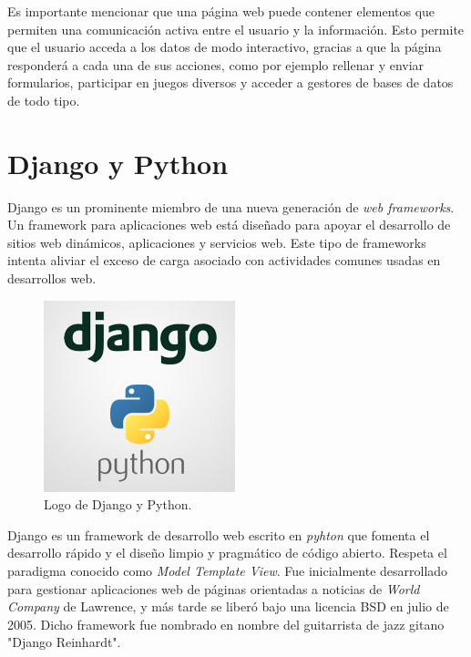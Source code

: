 Es importante mencionar que una p\'agina web puede contener elementos que permiten una comunicaci\'on activa entre el usuario y la informaci\'on. Esto permite que el usuario acceda a los datos de modo interactivo, gracias a que la p\'agina responder\'a a cada una de sus acciones, como por ejemplo rellenar y enviar formularios, participar en juegos diversos y acceder a gestores de bases de datos de todo tipo.\\

\section{Django y Python}\label{SEC:Seccion2}

Django es un prominente miembro de una nueva generaci\'on de \textit{web frameworks}. Un framework para aplicaciones web est\'a dise\~nado para apoyar el desarrollo de sitios web din\'amicos, aplicaciones y servicios web. Este tipo de frameworks intenta aliviar el exceso de carga asociado con actividades comunes usadas en desarrollos web.\\

\begin{figure}[htbp]

    \centering
    	\includegraphics[scale=0.3]{./Figuras/djangoypythonlogo.jpg}
    \caption{Logo de Django y Python.}
    \label{fig:djangopython}
    
\end{figure}

Django es un framework de desarrollo web escrito en \textit{pyhton} que fomenta el desarrollo r\'apido y el dise\~no limpio y pragm\'atico de c\'odigo abierto. Respeta el paradigma conocido como \textit{Model Template View}. Fue inicialmente desarrollado para gestionar aplicaciones web de p\'aginas orientadas a noticias de \textit{World Company} de Lawrence, y m\'as tarde se liber\'o bajo una licencia BSD en julio de 2005. Dicho framework fue nombrado en nombre del guitarrista de jazz gitano "Django Reinhardt".\\

